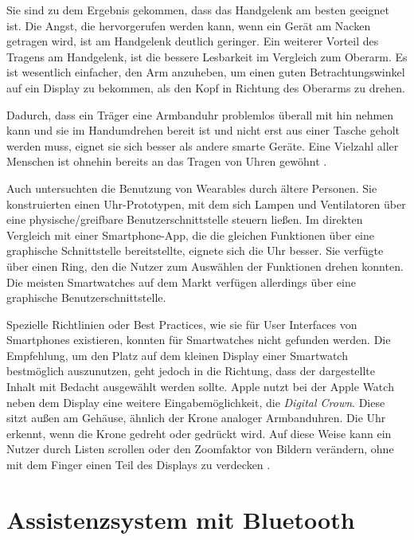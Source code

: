 Sie sind zu dem Ergebnis gekommen, dass das Handgelenk am besten geeignet ist. Die Angst, die hervorgerufen werden kann, wenn ein Gerät am Nacken getragen wird, ist am Handgelenk deutlich geringer. Ein weiterer Vorteil des Tragens am Handgelenk, ist die bessere Lesbarkeit im Vergleich zum Oberarm. Es ist wesentlich einfacher, den Arm anzuheben, um einen guten Betrachtungswinkel auf ein Display zu bekommen, als den Kopf in Richtung des Oberarms zu drehen.

Dadurch, dass ein Träger eine Armbanduhr problemlos überall mit hin nehmen kann und sie im Handumdrehen bereit ist und nicht erst aus einer Tasche geholt werden muss, eignet sie sich besser als andere smarte Geräte. Eine Vielzahl aller Menschen ist ohnehin bereits an das Tragen von Uhren gewöhnt \cite{Raghunath:2002:User-Interfaces-for-Applications}.

Auch \textcite{Sin:2015:Evaluation-of-Wearable-Device} untersuchten die Benutzung von Wearables durch ältere Personen. Sie konstruierten einen Uhr-Prototypen, mit dem sich Lampen und Ventilatoren über eine physische/greifbare Benutzerschnittstelle  steuern ließen. Im direkten Vergleich mit einer Smartphone-App, die die gleichen Funktionen über eine graphische Schnittstelle bereitstellte, eignete sich die Uhr besser. Sie verfügte über einen Ring, den die Nutzer zum Auswählen der Funktionen drehen konnten. Die meisten Smartwatches auf dem Markt verfügen allerdings über eine graphische Benutzerschnittstelle.

Spezielle Richtlinien oder Best Practices, wie sie für User Interfaces von Smartphones existieren, konnten für Smartwatches nicht gefunden werden. Die Empfehlung, um den Platz auf dem kleinen Display einer Smartwatch bestmöglich auszunutzen, geht jedoch in die Richtung, dass der dargestellte Inhalt mit Bedacht ausgewählt werden sollte. Apple nutzt bei der Apple Watch neben dem Display eine weitere Eingabemöglichkeit, die \emph{Digital Crown}. Diese sitzt außen am Gehäuse, ähnlich der Krone analoger Armbanduhren. Die Uhr erkennt, wenn die Krone gedreht oder gedrückt wird. Auf diese Weise kann ein Nutzer durch Listen scrollen oder den Zoomfaktor von Bildern verändern, ohne mit dem Finger einen Teil des Displays zu verdecken \cite{Wu:2016:Study-of-Smart-Watch}.

\section{Assistenzsystem mit Bluetooth}

